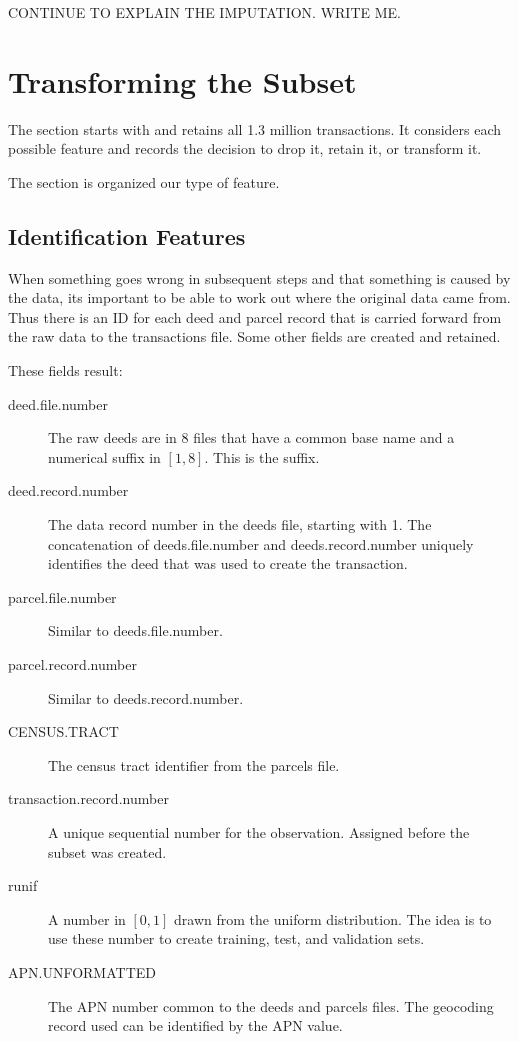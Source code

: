 CONTINUE TO EXPLAIN THE IMPUTATION. WRITE ME.

\section{Transforming the Subset}

The section starts with and retains all 1.3 million transactions. It
considers each possible feature and records the decision to drop it,
retain it, or transform it.

The section is organized our type of feature.

\subsection{Identification Features}

When something goes wrong in subsequent steps and that something is
caused by the data, its important to be able to work out where the
original data came from. Thus there is an ID for each deed and parcel
record that is carried forward from the raw data to the transactions
file. Some other fields are created and retained.

These fields result:
\begin{description}
\item[deed.file.number] The raw deeds are in 8 files that have a
  common base name and a numerical suffix in $[1,8]$. This is the
  suffix.
\item[deed.record.number] The data record number in the deeds file,
  starting with 1. The concatenation of deeds.file.number and
  deeds.record.number uniquely identifies the deed that was used to
  create the transaction.
\item[parcel.file.number] Similar to deeds.file.number.
\item[parcel.record.number] Similar to deeds.record.number.
\item[CENSUS.TRACT] The census tract identifier from the parcels
  file.
\item[transaction.record.number] A unique sequential number for the
  observation. Assigned before the subset was created.
\item[runif] A number in $[0,1]$ drawn from the uniform
  distribution. The idea is to use these number to create training,
  test, and validation sets.
\item[APN.UNFORMATTED] The APN number common to the deeds and parcels files. The
  geocoding record used can be identified by the APN value.
\end{description}


